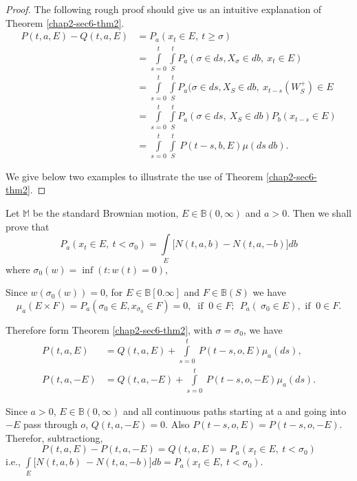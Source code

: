 \begin{proof}
The following rough proof should give us an intuitive explanation of
Theorem \ref{chap2-sec6-thm2}. 
\begin{align*}
  P (t,a,E) - Q (t,a,E)  & =  P_a (x_t \in  E, ~ t \ge \sigma ) \\
  &= \int \limits^{t}_{s=0} \int \limits^{t}_{S} P_a ( \sigma \in ds,
  X_\sigma \in db, ~ x_t \in E)\\ 
  &= \int \limits^{t}_{s=0} \int \limits^{t}_{S} P_a ( \sigma \in ds,
  X_S \in db, ~ x_{t-s}  ( W^+_S ) \in E \\ 
  &= \int \limits^{t}_{s=0} \int \limits^{t}_{S} P_a ( \sigma \in ds,\
  X_S \in db)  P_b ( x_{t-s} \in E) \\ 
  &= \int \limits^{t}_{s=0} \int \limits^{t}_{S}  ~ P (t-s, b,E) \mu
  (ds ~ db). 
\end{align*}

We give below two examples to illustrate the use of Theorem
\ref{chap2-sec6-thm2}. 
\end{proof}

\setcounter{exam}{0}
\begin{exam}\label{chap2-sec6-exam1}%
  Let $\mathbb{M}$ be the standard Brownian motion, $E \in \mathbb{B}
  (0, \infty)$ and $a > 0$. Then we shall prove that  
$$
P_a (x_t \in E, ~ t< \sigma_0) = \int\limits_{E} \big[ N (t,a,b) - N
    (t,a,-b) \big] db  
$$\pageoriginale
where $\sigma_0 (w) = \inf (t : w (t) = 0 )$,
  
  Since $w ( \sigma_0 (w)) = 0$, for $E \in  \mathbb{B} [ 0. \infty]$
  and $F \in \mathbb{B} (S)$ we have 
  $$
  \mu_a (E \times F) = P_a (\sigma_0 \in E, x_{\sigma_{0}}\in F)  = 0,
  ~ \text{ if } ~ 0 \in F;\ \ P_a (~ \sigma_0 \in E ), \text{ if } ~ 0 \in F. 
  $$
\end{exam}


Therefore form Theorem \ref{chap2-sec6-thm2}, with $\sigma =
\sigma_0$, we have 
\begin{align*}
  P (t,a,E) & = Q (t,a,E) + \int \limits^{t}_{s=0} ~ P (t-s,o,E) \mu_a (ds), \\
  P (t,a,-E) & = Q (t,a,-E) + \int \limits^{t}_{s=0} ~ P (t-s,o,-E) \mu_a (ds).
\end{align*}

Since $a > 0$, $E \in \mathbb{B} (0,\infty)$ and all continuous paths
starting at a  and going into $-E$ pass through $o$, $Q (t,a,-E) =
0$. Also $P(t-s,o,E) = P (t-s,o,-E)$. Therefor, subtractiong, 
$$
P (t,a,E) -P (t,a,-E) = Q (t,a,E) =  P_a (x_t \in E, ~ t < \sigma_0)
$$
i.e., \qquad  $\int \limits_{E} \big [ N (t,a,b) ~ -N (t,a,-b) \big]
db = P_a (x_t \in E, ~ t < \sigma_0)$. 

